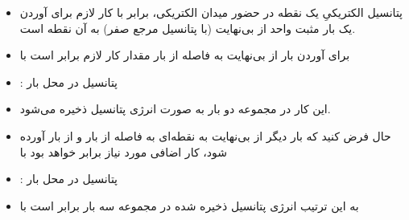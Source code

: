 \begin{ELunit}


\begin{itemize}
\tightlist
\item
  پتانسیل الکتریکیِ یک نقطه در حضور میدان الکتریکی، برابر با کار لازم برای آوردن یک بار مثبت واحد از بی‌نهایت (با پتانسیل مرجع صفر) به آن نقطه است.
\item
  برای آوردن بار  از بی‌نهایت به فاصله  از بار  مقدار کار لازم برابر است با
\end{itemize}



\begin{itemize}
\tightlist
\item
  : پتانسیل در محل بار 
\end{itemize}


\begin{itemize}
\item
  این کار در مجموعه دو بار به صورت انرژی پتانسیل ذخیره می‌شود.
\item
  حال فرض کنید که بار دیگر  از بی‌نهایت به نقطه‌ای به فاصله  از بار  و  از بار  آورده شود، کار اضافی مورد نیاز برابر خواهد بود با
\end{itemize}



\begin{itemize}
\tightlist
\item
  : پتانسیل در محل بار 
\item
  به این ترتیب انرژی پتانسیل ذخیره شده در مجموعه سه بار برابر است با
\end{itemize}


\end{ELunit}

